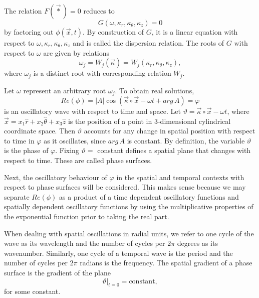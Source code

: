 \documentclass[12pt]{article}
\theoremstyle{definition}
\numberwithin{equation}{section}
\begin{document}
{The relation $F(\vec{*})=0$ reduces to 
\begin{equation}
G(\omega,\kappa_r,\kappa_\theta,\kappa_z)=0
\label{disprel1.eqn}
\end{equation}
by factoring out $\phi (\vec{x},t)$. By construction of $G$, it is a linear equation with respect to $\omega,\kappa_r,\kappa_\theta,\kappa_z$ and is called the dispersion relation. The roots of $G$ with respect to $\omega$ are given by relations
$$\omega_j=W_j(\vec{\kappa})=W_j(\kappa_r,\kappa_\theta,\kappa_z),$$
where $\omega_j$ is a distinct root with corresponding relation $W_j$.

Let $\omega$ represent an arbitrary root $\omega_j$. To obtain real solutions,
\begin{equation}
Re(\phi)=\vert A\vert\cos (\vec{\kappa}\circ\vec{x}-\omega t+arg\,A)=\varphi
\label{genrealsol.eqn}
\end{equation}
is an oscillatory wave with respect to time and space. Let $\vartheta=\vec{\kappa}\circ\vec{x}-\omega t$, where $\vec{x}=x_1\hat{r}+x_2\hat{\theta}+x_3\hat{z}$ is the position of a point in 3-dimensional cylindrical coordinate space. Then $\vartheta$ accounts for any change in spatial position with respect to time in $\varphi$ as it oscillates, since $arg\,A$ is constant. By definition, the variable $\vartheta$ is the phase of $\varphi$. Fixing $\vartheta=$ constant defines a spatial plane that changes with respect to time. These are called phase surfaces.

Next, the oscillatory behaviour of $\varphi$ in the spatial and temporal contexts with respect to phase surfaces will be considered. This makes sense because we may separate $Re(\phi)$ as a product of a time dependent oscillatory functions and spatially dependent oscillatory functions by using the multiplicative properties of the exponential function prior to taking the real part.

When dealing with spatial oscillations in radial units, we refer to one cycle of the wave as its wavelength and the number of cycles per $2\pi$ degrees as its wavenumber. Similarly, one cycle of a temporal wave is the period and the number of cycles per $2\pi$ radians is the frequency. The spatial gradient of a phase surface is the gradient of the plane
$$\vartheta\vert_{t=0}=\text{constant},$$
for some constant.

}
\end{document}
